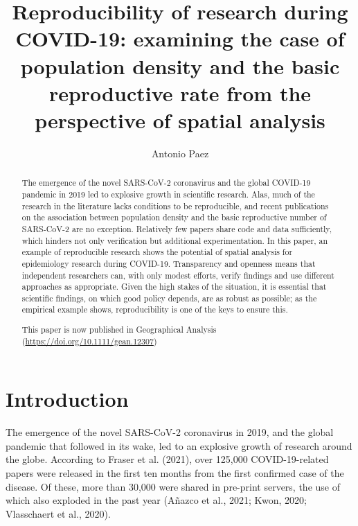 \documentclass[]{elsarticle} %
\begin{document}
\begin{frontmatter}

  \title{Reproducibility of research during COVID-19: examining the case
of population density and the basic reproductive rate from the
perspective of spatial analysis}
    \author[McMaster University]{Antonio Paez}
      \address[McMaster University]{School of Earth, Environment and
Society, 1280 Main St West, Hamilton, Ontario L8S 4K1 Canada}
  
  \begin{abstract}
  The emergence of the novel SARS-CoV-2 coronavirus and the global
  COVID-19 pandemic in 2019 led to explosive growth in scientific
  research. Alas, much of the research in the literature lacks
  conditions to be reproducible, and recent publications on the
  association between population density and the basic reproductive
  number of SARS-CoV-2 are no exception. Relatively few papers share
  code and data sufficiently, which hinders not only verification but
  additional experimentation. In this paper, an example of reproducible
  research shows the potential of spatial analysis for epidemiology
  research during COVID-19. Transparency and openness means that
  independent researchers can, with only modest efforts, verify findings
  and use different approaches as appropriate. Given the high stakes of
  the situation, it is essential that scientific findings, on which good
  policy depends, are as robust as possible; as the empirical example
  shows, reproducibility is one of the keys to ensure this.

  This paper is now published in Geographical Analysis
  (\url{https://doi.org/10.1111/gean.12307})
  \end{abstract}
  
 \end{frontmatter}

\newpage

\hypertarget{introduction}{%
\section{Introduction}\label{introduction}}

The emergence of the novel SARS-CoV-2 coronavirus in 2019, and the
global pandemic that followed in its wake, led to an explosive growth of
research around the globe. According to Fraser et al. (2021), over
125,000 COVID-19-related papers were released in the first ten months
from the first confirmed case of the disease. Of these, more than 30,000
were shared in pre-print servers, the use of which also exploded in the
past year (Añazco et al., 2021; Kwon, 2020; Vlasschaert et al., 2020).
\end{document}
